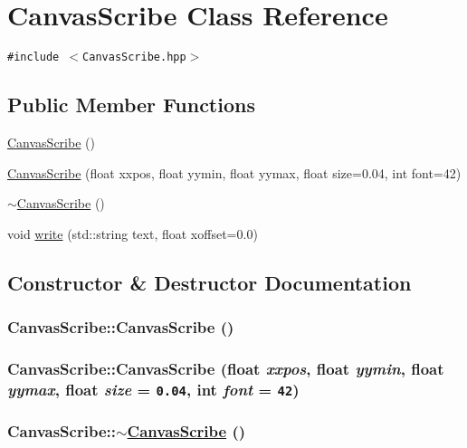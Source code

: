 \hypertarget{classCanvasScribe}{
\section{Canvas\-Scribe Class Reference}
\label{classCanvasScribe}
}
{\tt \#include $<$Canvas\-Scribe.hpp$>$}

\subsection*{Public Member Functions}
\begin{CompactItemize}
\item 
\hyperlink{classCanvasScribe_a0}{Canvas\-Scribe} ()
\item 
\hyperlink{classCanvasScribe_a1}{Canvas\-Scribe} (float xxpos, float yymin, float yymax, float size=0.04, int font=42)
\item 
\hyperlink{classCanvasScribe_a2}{$\sim$Canvas\-Scribe} ()
\item 
void \hyperlink{classCanvasScribe_a3}{write} (std::string text, float xoffset=0.0)
\end{CompactItemize}


\subsection{Constructor \& Destructor Documentation}
\hypertarget{classCanvasScribe_a0}{
\subsubsection[CanvasScribe]{\setlength{\rightskip}{0pt plus 5cm}Canvas\-Scribe::Canvas\-Scribe ()}}
\label{classCanvasScribe_a0}


\hypertarget{classCanvasScribe_a1}{
\subsubsection[CanvasScribe]{\setlength{\rightskip}{0pt plus 5cm}Canvas\-Scribe::Canvas\-Scribe (float {\em xxpos}, float {\em yymin}, float {\em yymax}, float {\em size} = {\tt 0.04}, int {\em font} = {\tt 42})}}
\label{classCanvasScribe_a1}


\hypertarget{classCanvasScribe_a2}{
\subsubsection[$\sim$CanvasScribe]{\setlength{\rightskip}{0pt plus 5cm}Canvas\-Scribe::$\sim$\hyperlink{classCanvasScribe}{Canvas\-Scribe} ()}}
\label{classCanvasScribe_a2}




